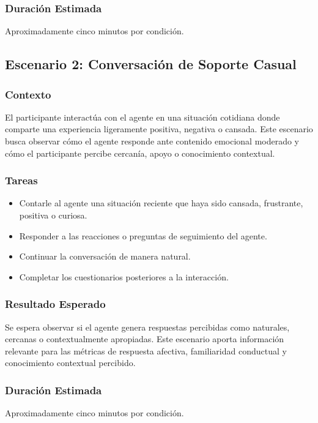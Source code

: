 \documentclass[12pt]{article}
\begin{document}
\subsubsection{Duración Estimada}

Aproximadamente cinco minutos por condición.

\subsection{Escenario 2: Conversación de Soporte Casual}

\subsubsection{Contexto}

El participante interactúa con el agente en una situación cotidiana donde comparte una experiencia ligeramente positiva, negativa o cansada. Este escenario busca observar cómo el agente responde ante contenido emocional moderado y cómo el participante percibe cercanía, apoyo o conocimiento contextual.

\subsubsection{Tareas}

\begin{itemize}
    \item Contarle al agente una situación reciente que haya sido cansada, frustrante, positiva o curiosa.
    \item Responder a las reacciones o preguntas de seguimiento del agente.
    \item Continuar la conversación de manera natural.
    \item Completar los cuestionarios posteriores a la interacción.
\end{itemize}

\subsubsection{Resultado Esperado}

Se espera observar si el agente genera respuestas percibidas como naturales, cercanas o contextualmente apropiadas. Este escenario aporta información relevante para las métricas de respuesta afectiva, familiaridad conductual y conocimiento contextual percibido.

\subsubsection{Duración Estimada}

Aproximadamente cinco minutos por condición.
\end{document}
